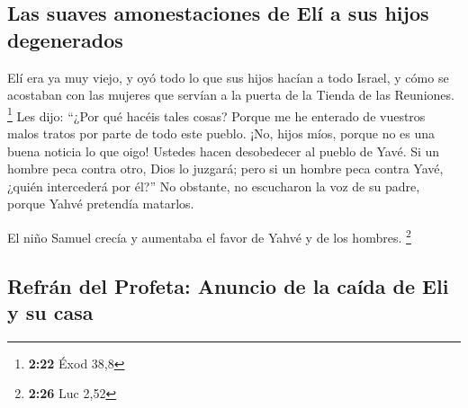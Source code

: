 \begin{paracol}{2}
{\subsection{Las suaves amonestaciones de Elí a sus hijos
degenerados}\label{las-suaves-amonestaciones-de-eluxed-a-sus-hijos-degenerados}}

 Elí era ya muy viejo, y oyó todo lo que sus hijos hacían
a todo Israel, y cómo se acostaban con las mujeres que servían a la
puerta de la Tienda de las Reuniones. \footnote{\textbf{2:22} Éxod 38,8}
 Les dijo: ``¿Por qué hacéis tales cosas? Porque me he
enterado de vuestros malos tratos por parte de todo este pueblo.
 ¡No, hijos míos, porque no es una buena noticia lo que
oigo! Ustedes hacen desobedecer al pueblo de Yavé.  Si un
hombre peca contra otro, Dios lo juzgará; pero si un hombre peca contra
Yavé, ¿quién intercederá por él?'' No obstante, no escucharon la voz de
su padre, porque Yahvé pretendía matarlos.

 El niño Samuel crecía y aumentaba el favor de Yahvé y de
los hombres. \footnote{\textbf{2:26} Luc 2,52}

\hypertarget{refruxe1n-del-profeta-anuncio-de-la-cauxedda-de-eli-y-su-casa}{%
\subsection{Refrán del Profeta: Anuncio de la caída de Eli y su
casa}\label{refruxe1n-del-profeta-anuncio-de-la-cauxedda-de-eli-y-su-casa}}


\end{paracol}
